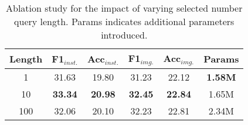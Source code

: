 \begin{table}[t]
\caption{Ablation study for the impact of varying selected number query length. Params indicates additional parameters introduced.}

\footnotesize
\label{tab:length_ablation}
  \centering
\begin{adjustbox}{width=\linewidth}
  \begin{tabular}{c  c  c c c c}
    \toprule
    Length &  F1$_{inst.}$ & Acc$_{inst.}$ & F1$_{img.}$ & Acc$_{img.}$ & Params\\
    \midrule 
1  & 31.63 & 19.80 & 31.23 & 22.12 & \textbf{1.58M}\\
10  & \textbf{33.34} & \textbf{20.98} & \textbf{32.45} & \textbf{22.84} & 1.65M\\
100 &  32.06 & 20.10  & 32.23  & 22.81 & 2.34M \\

  \bottomrule

\end{tabular}
\end{adjustbox}

\end{table}

